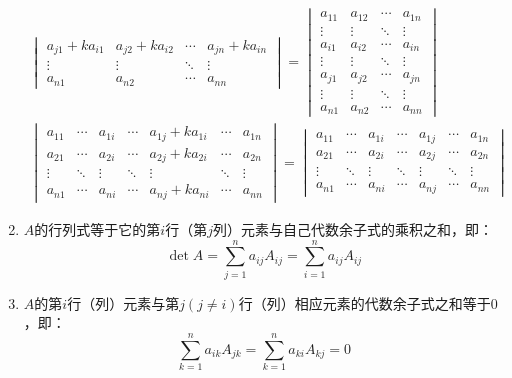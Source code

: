 \begin{property}
\begin{enumerate}
\begin{gather*}
\begin{vmatrix}
				a_{j1}+ka_{i1} & a_{j2}+ka_{i2} & \cdots & a_{jn}+ka_{in} \\
				\vdots & \vdots & \ddots & \vdots \\
				a_{n1} & a_{n2} & \cdots & a_{nn}
			\end{vmatrix}=
			\begin{vmatrix}
				a_{11} & a_{12} & \cdots & a_{1n} \\
				\vdots & \vdots & \ddots & \vdots \\
				a_{i1} & a_{i2} & \cdots & a_{in} \\
				\vdots & \vdots & \ddots & \vdots \\
				a_{j1} & a_{j2} & \cdots & a_{jn} \\
				\vdots & \vdots & \ddots & \vdots \\
				a_{n1} & a_{n2} & \cdots & a_{nn}
			\end{vmatrix} \\
			\begin{vmatrix}
				a_{11} & \cdots & a_{1i} & \cdots & a_{1j}+ka_{1i} & \cdots & a_{1n} \\
				a_{21} & \cdots & a_{2i} & \cdots & a_{2j}+ka_{2i} & \cdots & a_{2n} \\
				\vdots & \ddots & \vdots & \ddots & \vdots & \ddots & \vdots \\
				a_{n1} & \cdots & a_{ni} & \cdots & a_{nj}+ka_{ni}  & \cdots & a_{nn}
			\end{vmatrix}=
			\begin{vmatrix}
				a_{11} & \cdots & a_{1i} & \cdots & a_{1j} & \cdots & a_{1n} \\
				a_{21} & \cdots & a_{2i} & \cdots & a_{2j} & \cdots & a_{2n} \\
				\vdots & \ddots & \vdots & \ddots & \vdots & \ddots & \vdots \\
				a_{n1} & \cdots & a_{ni} & \cdots & a_{nj} & \cdots & a_{nn}
			\end{vmatrix}
		\end{gather*}
		\item $A$的行列式等于它的第$i$行（第$j$列）元素与自己代数余子式的乘积之和，即：
		\begin{equation*}
			\det A=\sum_{j=1}^{n}a_{ij}A_{ij}=\sum_{i=1}^{n}a_{ij}A_{ij}
		\end{equation*}
		\item $A$的第$i$行（列）元素与第$j(j\ne i)$行（列）相应元素的代数余子式之和等于$0$，即：
		\begin{equation*}
			\sum_{k=1}^{n}a_{ik}A_{jk}=\sum_{k=1}^{n}a_{ki}A_{kj}=0

\end{equation*}
\end{enumerate}
\end{property}
